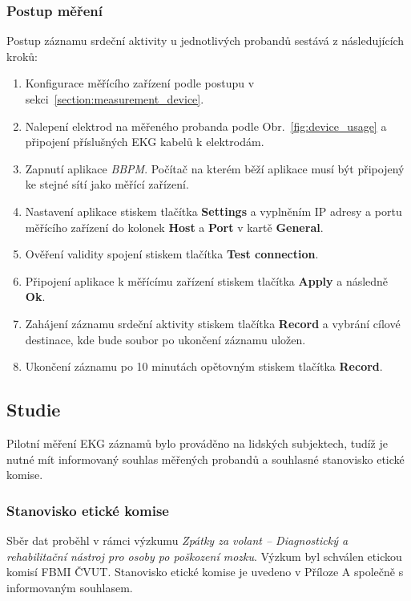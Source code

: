\subsubsection{Postup měření}
\label{section:measurement_process}
Postup záznamu srdeční aktivity u jednotlivých probandů sestává z
následujících kroků:
\begin{enumerate}
    \item Konfigurace měřícího zařízení podle postupu v sekci~\ref{section:measurement_device}.
    \item Nalepení elektrod na měřeného probanda podle
    Obr.~\ref{fig:device_usage} a připojení příslušných EKG kabelů k elektrodám.
    \item Zapnutí aplikace \textit{BBPM}. Počítač na kterém běží aplikace musí
          být připojený ke stejné sítí jako měřící zařízení.
    \item Nastavení aplikace stiskem tlačítka \textbf{Settings} a vyplněním IP
          adresy a portu měřícího zařízení do kolonek \textbf{Host} a \textbf{Port} v
          kartě \textbf{General}.
    \item Ověření validity spojení stiskem tlačítka \textbf{Test connection}.
    \item Připojení aplikace k měřícímu zařízení stiskem tlačítka
          \textbf{Apply} a následně \textbf{Ok}.
    \item Zahájení záznamu srdeční aktivity stiskem tlačítka \textbf{Record} a
          vybrání cílové destinace, kde bude soubor po ukončení záznamu uložen.
    \item Ukončení záznamu po 10 minutách opětovným stiskem tlačítka \textbf{Record}.
\end{enumerate}

\subsection{Studie}
\label{section:study}
Pilotní měření EKG záznamů bylo prováděno na lidských subjektech, tudíž je nutné
mít informovaný souhlas měřených probandů a souhlasné stanovisko etické komise.

\subsubsection{Stanovisko etické komise}
Sběr dat proběhl v rámci výzkumu \textit{Zpátky za volant -- Diagnostický a
rehabilitační nástroj pro osoby po poškození mozku}. Výzkum byl schválen etickou
komisí FBMI ČVUT. Stanovisko etické komise je uvedeno v Příloze A společně s
informovaným souhlasem.

